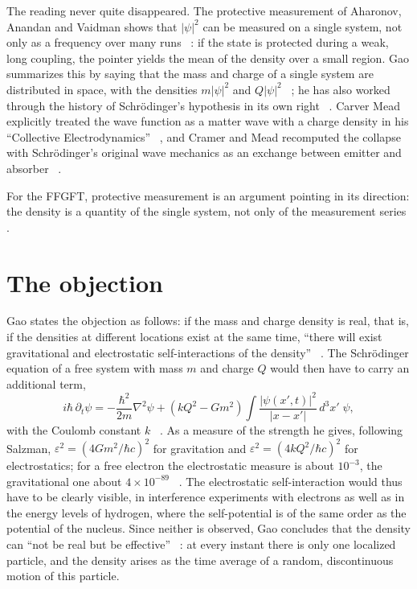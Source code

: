 The reading never quite disappeared. The protective measurement of Aharonov, Anandan and Vaidman
shows that $|\psi|^2$ can be measured on a single system, not only as a frequency over many runs
\QM~\cite{AharonovVaidman1993,AAV1993}: if the state is protected during a weak, long coupling, the
pointer yields the mean of the density over a small region. Gao summarizes this by saying that the
mass and charge of a single system are distributed in space, with the densities $m|\psi|^2$ and
$Q|\psi|^2$ \QM~\cite{Gao2011}; he has also worked through the history of Schrödinger's hypothesis in
its own right \QM~\cite{Gao2017}. Carver Mead explicitly treated the wave function as a matter wave
with a charge density in his \enquote{Collective Electrodynamics} \QM~\cite{Mead2000}, and Cramer and
Mead recomputed the collapse with Schrödinger's original wave mechanics as an exchange between
emitter and absorber \QM~\cite{CramerMead2020}.

For the FFGFT, protective measurement is an argument pointing in its direction: the density is a
quantity of the single system, not only of the measurement series \SM.

\section{The objection}

Gao states the objection as follows: if the mass and charge density is real, that is, if the
densities at different locations exist at the same time, \enquote{there will exist gravitational and
electrostatic self-interactions of the density} \QM~\cite{Gao2011}. The Schrödinger equation of a
free system with mass $m$ and charge $Q$ would then have to carry an additional term,
\begin{equation}
  i\hbar\,\partial_t\psi=-\frac{\hbar^2}{2m}\nabla^2\psi
  +\left(kQ^2-Gm^2\right)\!\int\!\frac{|\psi(x',t)|^2}{|x-x'|}\,d^3x'\;\psi ,
  \label{eq:gao}
\end{equation}
with the Coulomb constant $k$ \QM~\cite{Gao2011}. As a measure of the strength he gives, following
Salzman, $\varepsilon^2=(4Gm^2/\hbar c)^2$ for gravitation and $\varepsilon^2=(4kQ^2/\hbar c)^2$ for
electrostatics; for a free electron the electrostatic measure is about $10^{-3}$, the gravitational
one about $4\times10^{-89}$ \QM~\cite{Gao2011,Salzman2005}. The electrostatic self-interaction would
thus have to be clearly visible, in interference experiments with electrons as well as in the energy
levels of hydrogen, where the self-potential is of the same order as the potential of the nucleus.
Since neither is observed, Gao concludes that the density can \enquote{not be real but be effective}
\QM~\cite{Gao2011}: at every instant there is only one localized particle, and the density arises as
the time average of a random, discontinuous motion of this particle.

